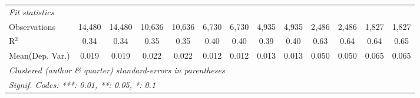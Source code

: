 \begin{tabular}{lcccccccccccc}
   \midrule
   \emph{Fit statistics}\\
   Observations                             & 14,480        & 14,480         & 10,636        & 10,636        & 6,730         & 6,730          & 4,935         & 4,935          & 2,486   & 2,486         & 1,827   & 1,827\\  
   R$^2$                                    & 0.34          & 0.34           & 0.35          & 0.35          & 0.40          & 0.40           & 0.39          & 0.40           & 0.63    & 0.64          & 0.64    & 0.65\\  
Mean(Dep. Var.) & 0.019 & 0.019 & 0.022 & 0.022 & 0.012 & 0.012 & 0.013 & 0.013 & 0.050 & 0.050 & 0.065 & 0.065 \\
   \midrule \midrule
   \multicolumn{13}{l}{\emph{Clustered (author \& quarter) standard-errors in parentheses}}\\
   \multicolumn{13}{l}{\emph{Signif. Codes: ***: 0.01, **: 0.05, *: 0.1}}\\
\end{tabular}
\par\endgroup
